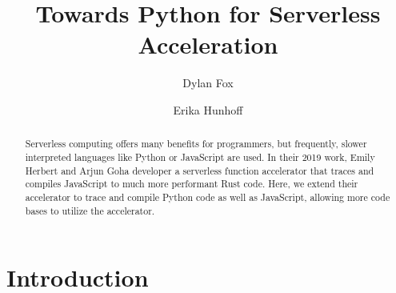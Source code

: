 \documentclass[acmsmall,review,authorversion]{acmart}
\begin{document}
\title{Towards Python for Serverless Acceleration}

\author{Dylan Fox}
\author{Erika Hunhoff}

\begin{abstract}
     Serverless computing offers many benefits for programmers, but frequently, slower interpreted languages like Python or JavaScript are used. In their 2019 work, Emily Herbert and Arjun Goha developer a serverless function accelerator that traces and compiles JavaScript to much more performant Rust code. Here, we extend their accelerator to trace and compile Python code as well as JavaScript, allowing more code bases to utilize the accelerator.
\end{abstract}

\maketitle

\section{Introduction}
\end{document}
